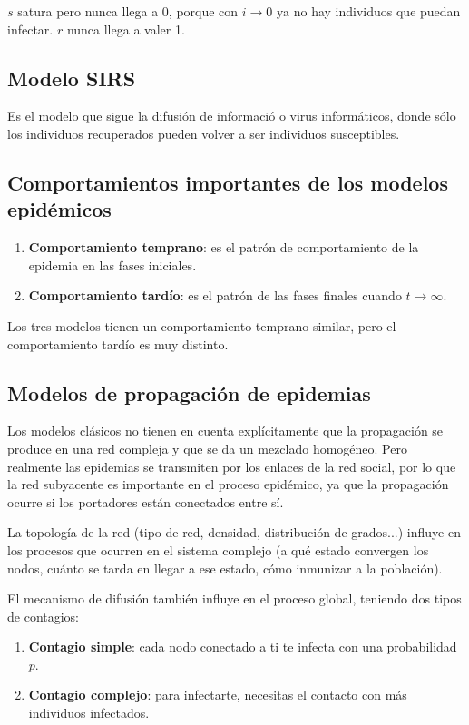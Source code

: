 \documentclass[10pt,spanish, landscape, twocolumn]{article}
\begin{document}
$s$ satura pero nunca llega a 0, porque con $i\rightarrow0$ ya no hay individuos que puedan infectar. $r$ nunca llega a valer 1.

\subsection{\textcolor{temasiete}Modelo SIRS}

Es el modelo que sigue la difusión de informació o virus informáticos, donde sólo los individuos recuperados pueden volver a ser individuos susceptibles.

\subsection{\textcolor{temasiete}Comportamientos importantes de los modelos epidémicos}
\begin{enumerate}[$\bullet$]
    \item \textbf{\textcolor{temasiete}{Comportamiento temprano}}: es el patrón de comportamiento de la epidemia en las fases iniciales.
    \item \textbf{\textcolor{temasiete}{Comportamiento tardío}}: es el patrón de las fases finales cuando $t\rightarrow\infty$.
\end{enumerate}

Los tres modelos tienen un comportamiento temprano similar, pero el comportamiento tardío es muy distinto.

\subsection{\textcolor{temasiete}Modelos de propagación de epidemias}

Los modelos clásicos no tienen en cuenta explícitamente que la propagación se produce en una red compleja y que se da un mezclado homogéneo. Pero realmente las epidemias se transmiten por los enlaces de la red social, por lo que la red subyacente es importante en el proceso epidémico, ya que la propagación ocurre si los portadores están conectados entre sí.

La topología de la red (tipo de red, densidad, distribución de grados...) influye en los procesos que ocurren en el sistema complejo (a qué estado convergen los nodos, cuánto se tarda en llegar a ese estado, cómo inmunizar a la población). 

El mecanismo de difusión también influye en el proceso global, teniendo dos tipos de contagios:
\begin{enumerate}
    \item \textbf{\textcolor{temasiete}{Contagio simple}}: cada nodo conectado a ti te infecta con una probabilidad $p$.
    \item \textbf{\textcolor{temasiete}{Contagio complejo}}: para infectarte, necesitas el contacto con más individuos infectados.
\end{enumerate}
\end{document}
